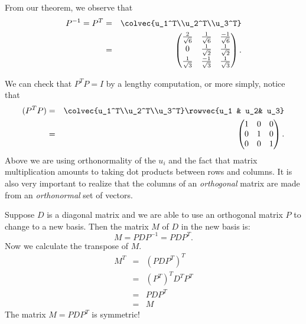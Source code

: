 \begin{example}
From our theorem, we observe that
\begin{eqnarray*}
P^{-1}=P^T &=& \colvec{u_1^T\\u_2^T\\u_3^T} \\
&=& \begin{pmatrix}
\frac{2}{\sqrt{6}}& \frac{1}{\sqrt{6}}& \frac{-1}{\sqrt{6}}\\[1mm]
0 & \frac{1}{\sqrt{2}}&\frac{1}{\sqrt{2}} \\[1mm]
\frac{1}{\sqrt{3}}& \frac{-1}{\sqrt{3}}&\frac{1}{\sqrt{3}}\\[1mm]
\end{pmatrix}. \\
\end{eqnarray*}

We can check that $P^TP=I$ by a lengthy computation, or more simply, notice that
\begin{eqnarray*}
(P^TP)%
&=& \colvec{u_1^T\\u_2^T\\u_3^T} \rowvec{u_1 & u_2& u_3} \\
&=& \begin{pmatrix}1&0&0\\0&1&0\\0&0&1\end{pmatrix}.
\end{eqnarray*}
Above we are using orthonormality of the $u_i$ and the fact that matrix multiplication amounts to taking dot products between rows and columns.
It is also very \hypertarget{basisorthog}{important to realize that the columns of an {\itshape orthogonal} matrix are made
from an {\itshape orthonormal} set of vectors}.
\end{example}

\begin{remark}
Suppose $D$ is a diagonal matrix  and we are able to use an orthogonal matrix $P$ to change to a new basis.  Then the matrix $M$ of $D$ in the new basis is:
\[
M = PDP^{-1} = PDP^T.
\]
Now we calculate the transpose of $M$.
\begin{eqnarray*}
M^T &=& (PDP^T)^T\\
&=& (P^T)^TD^TP^T \\
&=& PDP^T\\
&=& M
\end{eqnarray*}
The matrix $M=PDP^T$ is symmetric!
\end{remark}


